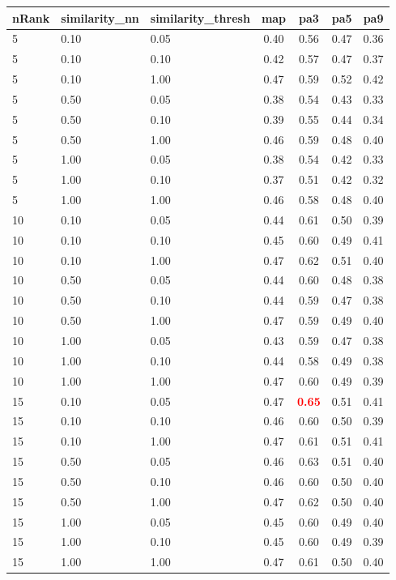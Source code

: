 \begin{tabular}{lllcccc} 
nRank & similarity\_nn & similarity\_thresh & map & pa3 & pa5 & pa9 \\ 
\hline 
 5 & 0.10 & 0.05 & 0.40 & 0.56 & 0.47 & 0.36 \\ 
 5 & 0.10 & 0.10 & 0.42 & 0.57 & 0.47 & 0.37 \\ 
 5 & 0.10 & 1.00 & 0.47 & 0.59 & 0.52 & 0.42 \\ 
 5 & 0.50 & 0.05 & 0.38 & 0.54 & 0.43 & 0.33 \\ 
 5 & 0.50 & 0.10 & 0.39 & 0.55 & 0.44 & 0.34 \\ 
 5 & 0.50 & 1.00 & 0.46 & 0.59 & 0.48 & 0.40 \\ 
 5 & 1.00 & 0.05 & 0.38 & 0.54 & 0.42 & 0.33 \\ 
 5 & 1.00 & 0.10 & 0.37 & 0.51 & 0.42 & 0.32 \\ 
 5 & 1.00 & 1.00 & 0.46 & 0.58 & 0.48 & 0.40 \\ 
10 & 0.10 & 0.05 & 0.44 & 0.61 & 0.50 & 0.39 \\ 
10 & 0.10 & 0.10 & 0.45 & 0.60 & 0.49 & 0.41 \\ 
10 & 0.10 & 1.00 & 0.47 & 0.62 & 0.51 & 0.40 \\ 
10 & 0.50 & 0.05 & 0.44 & 0.60 & 0.48 & 0.38 \\ 
10 & 0.50 & 0.10 & 0.44 & 0.59 & 0.47 & 0.38 \\ 
10 & 0.50 & 1.00 & 0.47 & 0.59 & 0.49 & 0.40 \\ 
10 & 1.00 & 0.05 & 0.43 & 0.59 & 0.47 & 0.38 \\ 
10 & 1.00 & 0.10 & 0.44 & 0.58 & 0.49 & 0.38 \\ 
10 & 1.00 & 1.00 & 0.47 & 0.60 & 0.49 & 0.39 \\ 
15 & 0.10 & 0.05 & 0.47 & \textbf{\textcolor{red}{0.65}} & 0.51 & 0.41 \\ 
15 & 0.10 & 0.10 & 0.46 & 0.60 & 0.50 & 0.39 \\ 
15 & 0.10 & 1.00 & 0.47 & 0.61 & 0.51 & 0.41 \\ 
15 & 0.50 & 0.05 & 0.46 & 0.63 & 0.51 & 0.40 \\ 
15 & 0.50 & 0.10 & 0.46 & 0.60 & 0.50 & 0.40 \\ 
15 & 0.50 & 1.00 & 0.47 & 0.62 & 0.50 & 0.40 \\ 
15 & 1.00 & 0.05 & 0.45 & 0.60 & 0.49 & 0.40 \\ 
15 & 1.00 & 0.10 & 0.45 & 0.60 & 0.49 & 0.39 \\ 
15 & 1.00 & 1.00 & 0.47 & 0.61 & 0.50 & 0.40 \\ 

\end{tabular}
